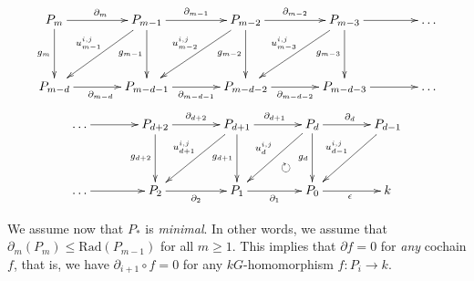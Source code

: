 \documentclass[12pt]{article}
\begin{document}
\begin{multline*}\label{masseypic}
\begin{xy}\xymatrix@+13pt{
P_m\ar[r]^{\partial_m}\ar[d]_{g_m}
&P_{m-1}\ar[r]^{\partial_{m-1}}\ar[d]_{g_{m-1}}\ar[dl]_{u^{i,j}_{m-1}}
&P_{m-2}\ar[r]^{\partial_{m-2}}\ar[d]_{g_{m-2}}\ar[dl]_{u^{i,j}_{m-2}}
&P_{m-3}\ar[r]\ar[d]_{g_{m-3}}\ar[dl]_{u^{i,j}_{m-3}}
&\dots\\
P_{m-d}\ar[r]_{\partial_{m-d}}
&P_{m-d-1}\ar[r]_{\partial_{m-d-1}}
&P_{m-d-2}\ar[r]_{\partial_{m-d-2}}
&P_{m-d-3}\ar[r]
&\dots
}
\end{xy}
\\
\begin{xy}{\xymatrix@+13pt{
\dots\ar[r]
&P_{d+2}\ar[r]^{\partial_{d+2}}\ar[d]_{g_{d+2}}
&P_{d+1}\ar[r]^{\partial_{d+1}}\ar[d]_{g_{d+1}}\ar[dl]_{u^{i,j}_{d+1}}
&P_d\ar[d]_{g_d}\ar[r]^{\partial_d}\ar[dl]_{u^{i,j}_d}
&P_{d-1}\ar[dl]_{u^{i,j}_{d-1}}\\
\dots\ar[r]
&P_2\ar[r]_{\partial_2}
&P_1\ar[r]_{\partial_1}
&P_0\ar[r]_\epsilon&k
}};
"2,4";"1,3"**{};
?(.35)*{\circlearrowright}
\end{xy}
\end{multline*}

We assume now that $P_\ast$ is {\em minimal}. In other words, we assume
that $\partial_m\left(P_m\right)\le\mathrm{Rad}\left(P_{m-1}\right)$
for all $m\ge 1$.
This implies that $\partial f=0$ for {\em any} cochain $f$,
that is, we have $\partial_{i+1}\circ f=0$ for any
$kG$-homomorphism $f:P_i\to k$.
\end{document}
